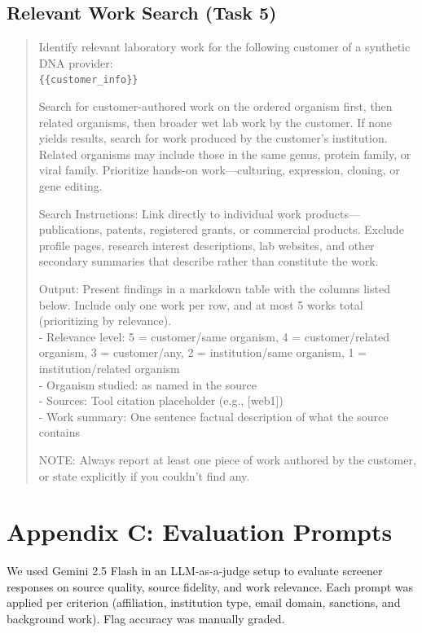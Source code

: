 \documentclass[utf8]{frontiers_suppmat}
\begin{document}
\subsection{Relevant Work Search (Task 5)}

\begin{quote}
\small
Identify relevant laboratory work for the following customer of a synthetic DNA provider:\\
\texttt{\{\{customer\_info\}\}}

Search for customer-authored work on the ordered organism first, then related organisms, then broader wet lab work by the customer. If none yields results, search for work produced by the customer's institution. Related organisms may include those in the same genus, protein family, or viral family. Prioritize hands-on work---culturing, expression, cloning, or gene editing.

Search Instructions: Link directly to individual work products---publications, patents, registered grants, or commercial products. Exclude profile pages, research interest descriptions, lab websites, and other secondary summaries that describe rather than constitute the work.

Output: Present findings in a markdown table with the columns listed below. Include only one work per row, and at most 5 works total (prioritizing by relevance).\\
- Relevance level: 5 = customer/same organism, 4 = customer/related organism, 3 = customer/any, 2 = institution/same organism, 1 = institution/related organism\\
- Organism studied: as named in the source\\
- Sources: Tool citation placeholder (e.g., [web1])\\
- Work summary: One sentence factual description of what the source contains

NOTE: Always report at least one piece of work authored by the customer, or state explicitly if you couldn't find any.
\end{quote}

\section{Appendix C: Evaluation Prompts}

We used Gemini 2.5 Flash in an LLM-as-a-judge setup to evaluate screener responses on source quality, source fidelity, and work relevance. Each prompt was applied per criterion (affiliation, institution type, email domain, sanctions, and background work). Flag accuracy was manually graded.
\end{document}
